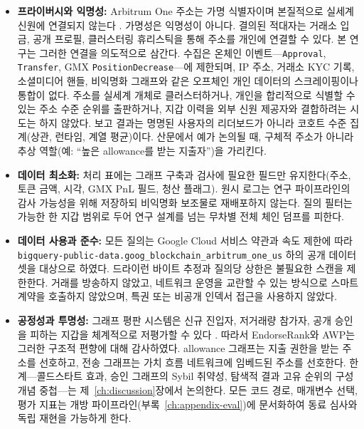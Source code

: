 \begin{itemize}
\item{}\label{sub:privacy-anonymity}
  \textbf{프라이버시와 익명성:} Arbitrum One 주소는 가명 식별자이며 본질적으로 실세계 신원에 연결되지 않는다 . 가명성은 익명성이 아니다. 결의된 적대자는 거래소 입금, 공개 프로필, 클러스터링 휴리스틱을 통해 주소를 개인에 연결할 수 있다. 본 연구는 그러한 연결을 의도적으로 삼간다. 수집은 온체인 이벤트---\texttt{Approval}, \texttt{Transfer}, GMX \texttt{PositionDecrease}---에 제한되며, IP 주소, 거래소 KYC 기록, 소셜미디어 핸들, 비익명화 그래프와 같은 오프체인 개인 데이터의 스크레이핑이나 통합이 없다. 주소를 실세계 개체로 클러스터하거나, 개인을 합리적으로 식별할 수 있는 주소 수준 순위를 출판하거나, 지갑 이력을 외부 신원 제공자와 결합하려는 시도는 하지 않았다. 보고 결과는 명명된 사용자의 리더보드가 아니라 코호트 수준 집계(상관, 런타임, 계열 평균)이다. 산문에서 예가 논의될 때, 구체적 주소가 아니라 추상 역할(예: ``높은 allowance를 받는 지출자'')을 가리킨다.


\item{}\label{sub:data-minimization}
  \textbf{데이터 최소화:} 처리 표에는 그래프 구축과 검사에 필요한 필드만 유지한다(주소, 토큰 금액, 시각, GMX PnL 필드, 청산 플래그). 원시 로그는 연구 파이프라인의 감사 가능성을 위해 저장하되 비익명화 보조물로 재배포하지 않는다. 질의 필터는 가능한 한 지갑 범위로 두어 연구 설계를 넘는 무차별 전체 체인 덤프를 피한다.


\item{}\label{sub:data-usage-compliance}
  \textbf{데이터 사용과 준수:} 모든 질의는 Google Cloud 서비스 약관과 속도 제한에 따라 \texttt{bigquery-public-data.goog\_blockchain\_arbitrum\_one\_us} 하의 공개 데이터셋을 대상으로 하였다. 드라이런 바이트 추정과 질의당 상한은 불필요한 스캔을 제한한다. 거래를 방송하지 않았고, 네트워크 운영을 교란할 수 있는 방식으로 스마트 계약을 호출하지 않았으며, 특권 또는 비공개 인덱서 접근을 사용하지 않았다.


\item{}\label{sub:fairness-transparency}
  \textbf{공정성과 투명성:} 그래프 평판 시스템은 신규 진입자, 저거래량 참가자, 공개 승인을 피하는 지갑을 체계적으로 저평가할 수 있다 . 따라서 EndorseRank와 AWP는 그러한 구조적 편향에 대해 감사하였다. allowance 그래프는 지출 권한을 받는 주소를 선호하고, 전송 그래프는 가치 흐름 네트워크에 임베드된 주소를 선호한다. 한계---콜드스타트 효과, 승인 그래프의 Sybil 취약성, 탐색적 결과 고유 순위의 구성 개념 중첩---는 제~\ref{ch:discussion}장에서 논의한다. 모든 코드 경로, 매개변수 선택, 평가 지표는 개방 파이프라인(부록~\ref{ch:appendix-eval})에 문서화하여 동료 심사와 독립 재현을 가능하게 한다.



\end{itemize}
